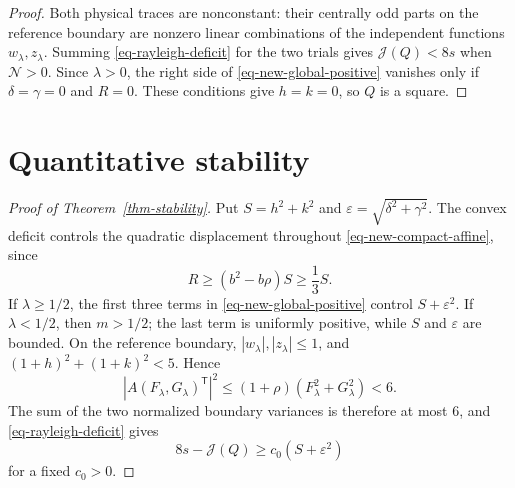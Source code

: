 \documentclass[11pt]{amsart}
\theoremstyle{remark}\newtheorem{remark}[theorem]{Remark}
\numberwithin{equation}{section}
\begin{document}
\begin{proof}
Both physical traces are nonconstant: their centrally odd parts on the
reference boundary are nonzero linear combinations of the independent
functions $w_\lambda,z_\lambda$. Summing \eqref{eq-rayleigh-deficit}
for the two trials gives $\mathcal J(Q)<8s$ when $\mathcal N>0$.
Since $\lambda>0$, the right side of \eqref{eq-new-global-positive}
vanishes only if $\delta=\gamma=0$ and $R=0$. These conditions give
$h=k=0$, so $Q$ is a square.
\end{proof}

\section{Quantitative stability}

\begin{proof}[Proof of Theorem~\ref{thm-stability}]
Put $S=h^2+k^2$ and $\varepsilon=\sqrt{\delta^2+\gamma^2}$.
The convex deficit controls the quadratic displacement throughout
\eqref{eq-new-compact-affine}, since
\[
R\ge(b^2-b\rho)S\ge\frac13S.
\]
If $\lambda\ge1/2$, the first three terms in
\eqref{eq-new-global-positive} control $S+\varepsilon^2$.
If $\lambda<1/2$, then $m>1/2$; the last term is uniformly positive,
while $S$ and $\varepsilon$ are bounded. On the reference boundary,
$|w_\lambda|,|z_\lambda|\le1$, and
$(1+h)^2+(1+k)^2<5$. Hence
\[
|A(F_\lambda,G_\lambda)^{\mathsf T}|^2
\le(1+\rho)(F_\lambda^2+G_\lambda^2)<6.
\]
The sum of the two normalized boundary variances is therefore at most
$6$, and \eqref{eq-rayleigh-deficit} gives
\begin{equation}\label{eq-new-quadratic-global}
8s-\mathcal J(Q)\ge c_0(S+\varepsilon^2)
\end{equation}
for a fixed $c_0>0$.


\end{proof}
\end{document}
